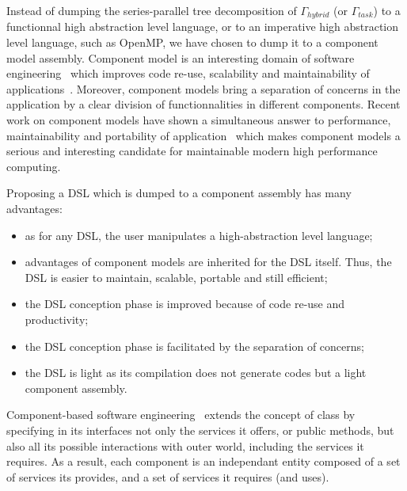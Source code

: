 Instead of dumping the series-parallel tree decomposition of $\Gamma_{hybrid}$ (or $\Gamma_{task}$) to a functionnal high abstraction level language, or to an imperative high abstraction level language, such as OpenMP, we have chosen to dump it to a component model assembly. Component model is an interesting domain of software engineering~\cite{Szyperski:2002:CSB:515228} which improves code re-use, scalability and maintainability of applications~\cite{Szyperski:2002:CSB:515228,bigot:inria-00388508}. Moreover, component models bring a separation of concerns in the application by a clear division of functionnalities in different components.
Recent work on component models have shown a simultaneous answer to performance, maintainability and portability of application~\cite{l2c} which makes component models a serious and interesting candidate for maintainable modern high performance computing. 

Proposing a DSL which is dumped to a component assembly has many advantages:
\begin{itemize}
\item as for any DSL, the user manipulates a high-abstraction level language;
\item advantages of component models are inherited for the DSL itself. Thus, the DSL is easier to maintain, scalable, portable and still efficient; %
\item the DSL conception phase is improved because of code re-use and productivity; %
\item the DSL conception phase is facilitated by the separation of concerns; %
\item the DSL is light as its compilation does not generate codes but a light component assembly. %
\end{itemize}

Component-based software engineering~\cite{Szyperski:2002:CSB:515228} extends the concept of class by specifying in its interfaces not only the services it offers, or public methods, but also all its possible interactions with outer world, including the services it requires. As a result, each component is an independant entity composed of a set of services its provides, and a set of services it requires (and uses). 


